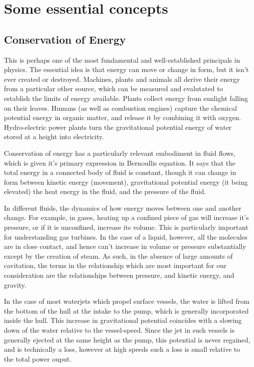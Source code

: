 \documentclass{article}\usepackage[]{graphicx}\usepackage[]{color}
\begin{document}
\section{Some essential concepts}

\subsection{Conservation of Energy}


This is perhaps one of the most fundamental and well-established principals in physics.  The essential idea is that energy can move or change in form, but it isn't ever created or destroyed.  Machines, plants and animals all derive their energy from a particular other source, which can be measured and evalutated to establish the limits of energy available.  Plants collect energy from sunlight falling on their leaves. Humans (as well as combustion engines) capture the chemical potential energy in organic matter, and release it by combining it with oxygen.  Hydro-electric power plants turn the gravitational potential energy of water stored at a height into electricity.

Conservation of energy has a particularly relevant embodiment in fluid flows, which is given it's primary expression in Bernoullis equation.  It says that the total energy in a connected body of fluid is constant, though it can change in form between kinetic energy (movement), gravitational potential energy (it being elevated) the heat energy in the fluid, and the pressure of the fluid.

In different fluids, the dynamics of how energy moves between one and another change.  For example, in gases, heating up a confined piece of gas will increase it's pressure, or if it is unconfined, increase its volume. This is particularly important for understanding gas turbines. In the case of a liquid, however, all the molecules are in close contact, and hence can't increase in volume or pressure substantially except by the creation of steam. As such, in the absence of large amounts of cavitation, the terms in the relationship which are most important for our consideration are the relationships between pressure, and kinetic energy, and gravity.

In the case of most waterjets which propel surface vessels, the water is lifted from the bottom of the hull at the intake to the pump, which is generally incorporated inside the hull. This increase in gravitational potential coincides with a slowing down of the water relative to the vessel-speed. Since the jet in such vessels is generally ejected at the same height as the pump, this potential is never regained, and is technically a loss, however at high speeds such a loss is small relative to the total power ouput.
\end{document}
